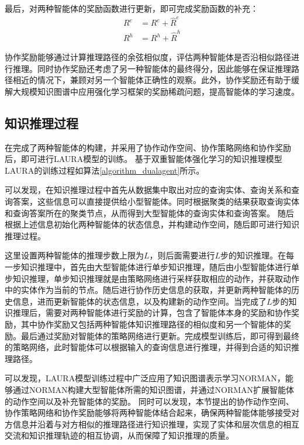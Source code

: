 \documentclass[algorithmlist, AutoFakeBold, AutoFakeSlant, figurelist, tablelist, nomlist, engineering, openany]{seuthesix} %
\begin{document}
最后，对两种智能体的奖励函数进行更新，即可完成奖励函数的补充：
\begin{equation}
  \begin{aligned}
    R^e &= R^e + \hat{R}^e \\
    R^h &= R^h + \hat{R}^h
  \end{aligned}
  \label{similar_reward}
\end{equation}

协作奖励能够通过计算推理路径的余弦相似度，评估两种智能体是否沿相似路径进行推理。同时协作奖励还考虑了另一种智能体的最终得分，因此能够在保证推理路径相近的情况下，兼顾对另一个智能体正确性的观察。此外，协作奖励还有助于缓解大规模知识图谱中应用强化学习框架的奖励稀疏问题，提高智能体的学习速度。

\subsection{知识推理过程}
在完成了两种智能体的构建，并采用了协作动作空间、协作策略网络和协作奖励后，即可进行LAURA模型的训练。
基于双重智能体强化学习的知识推理模型LAURA的训练过程如算法\ref{algorithm_dualagent}所示。

可以发现，在知识推理过程中首先从数据集中取出对应的查询实体、查询关系和查询答案，这些信息可以直接提供给小型智能体。同时根据聚类的结果获取查询实体和查询答案所在的聚类节点，从而得到大型智能体的查询实体和查询答案。
随后根据上述信息初始化两种智能体的状态信息，并构建动作空间，随后即可进行知识推理过程。

这里设置两种智能体的推理步数上限为$L$，则后面需要进行$L$步的知识推理。在每一步知识推理中，首先由大型智能体进行单步知识推理，随后由小型智能体进行单步知识推理，单步知识推理就是由策略网络进行采样获取相应的动作，并获取动作中的实体作为当前的节点。随后进行协作历史信息的获取，并更新两种智能体的历史信息，进而更新智能体的状态信息，以及构建新的动作空间。当完成了$L$步的知识推理后，需要对两种智能体进行奖励的计算，包含了智能体本身的奖励和协作奖励，其中协作奖励又包括两种智能体知识推理路径的相似度和另一个智能体的奖励。最后通过奖励对智能体的策略网络进行更新。完成模型训练后，即可得到最终的策略网络，此时智能体可以根据输入的查询信息进行推理，并得到合适的知识推理路径。

可以发现，LAURA模型训练过程中广泛应用了知识图谱表示学习NORMAN，能够通过NORMAN构建大型智能体所需的知识图谱，并通过NORMAN扩展智能体的动作空间以及补充智能体的奖励。
同时可以发现，本节提出的协作动作空间、协作策略网络和协作奖励能够将两种智能体结合起来，确保两种智能体能够接受对方信息并沿着与对方相似的推理路径进行知识推理，实现了实体和层次信息的相互交流和知识推理轨迹的相互协调，从而保障了知识推理的质量。
\end{document}
